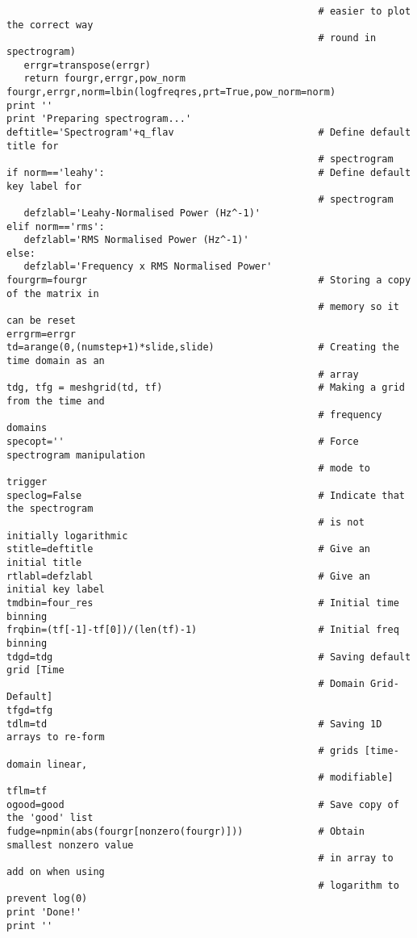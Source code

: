 \begin{verbatim}
                                                      # easier to plot the correct way
                                                      # round in spectrogram)
   errgr=transpose(errgr)
   return fourgr,errgr,pow_norm
fourgr,errgr,norm=lbin(logfreqres,prt=True,pow_norm=norm)  
print ''
print 'Preparing spectrogram...'
deftitle='Spectrogram'+q_flav                         # Define default title for
                                                      # spectrogram
if norm=='leahy':                                     # Define default key label for
                                                      # spectrogram
   defzlabl='Leahy-Normalised Power (Hz^-1)'
elif norm=='rms':
   defzlabl='RMS Normalised Power (Hz^-1)'
else:
   defzlabl='Frequency x RMS Normalised Power'
fourgrm=fourgr                                        # Storing a copy of the matrix in
                                                      # memory so it can be reset
errgrm=errgr
td=arange(0,(numstep+1)*slide,slide)                  # Creating the time domain as an
                                                      # array
tdg, tfg = meshgrid(td, tf)                           # Making a grid from the time and
                                                      # frequency domains
specopt=''                                            # Force spectrogram manipulation
                                                      # mode to trigger
speclog=False                                         # Indicate that the spectrogram
                                                      # is not initially logarithmic
stitle=deftitle                                       # Give an initial title
rtlabl=defzlabl                                       # Give an initial key label
tmdbin=four_res                                       # Initial time binning
frqbin=(tf[-1]-tf[0])/(len(tf)-1)                     # Initial freq binning
tdgd=tdg                                              # Saving default grid [Time
                                                      # Domain Grid- Default]
tfgd=tfg
tdlm=td                                               # Saving 1D arrays to re-form
                                                      # grids [time-domain linear,
                                                      # modifiable]
tflm=tf
ogood=good                                            # Save copy of the 'good' list
fudge=npmin(abs(fourgr[nonzero(fourgr)]))             # Obtain smallest nonzero value
                                                      # in array to add on when using
                                                      # logarithm to prevent log(0)
print 'Done!'
print ''


\end{verbatim}
